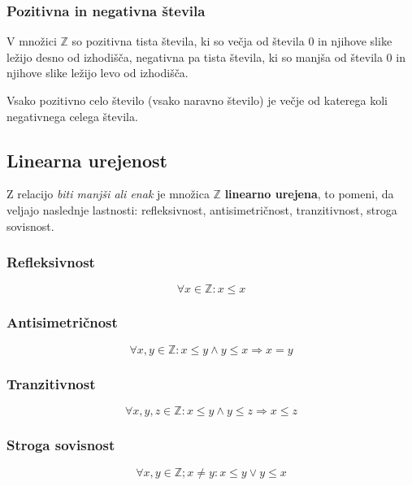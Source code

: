     \subsubsection*{Pozitivna in negativna števila}
        V množici $\mathbb{Z}$ so pozitivna tista števila, ki so večja od števila $0$ 
        in njihove slike ležijo desno od izhodišča, 
        negativna pa tista števila, ki so manjša od števila $0$ 
        in njihove slike ležijo levo od izhodišča.
    
        Vsako pozitivno celo število (vsako naravno število) je večje od katerega koli negativnega celega števila.
    



    


        \subsection{Linearna urejenost}

    
        Z relacijo \textit{biti manjši ali enak} je množica $\mathbb{Z}$ \textbf{linearno urejena}, 
        to pomeni, da veljajo naslednje lastnosti: refleksivnost, antisimetričnost, tranzitivnost, stroga sovisnost.
    
    
        \subsubsection*{Refleksivnost}
        $$\forall x\in\mathbb{Z}: x\leq x$$
    

        \subsubsection*{Antisimetričnost}
        $$\forall x,y\in\mathbb{Z}: x\leq y \land y\leq x \Rightarrow x=y$$
    

        \subsubsection*{Tranzitivnost}
        $$\forall x,y,z\in\mathbb{Z}: x\leq y \land y\leq z \Rightarrow x\leq z$$
    

        \subsubsection*{Stroga sovisnost}
        $$\forall x,y\in\mathbb{Z}; x\neq y: x\leq y \lor y\leq x$$

    



